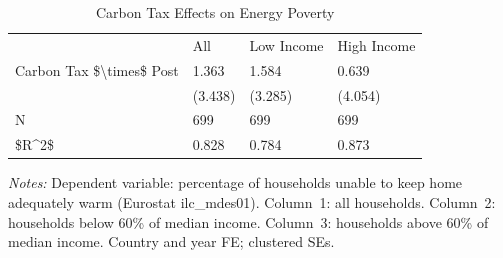 \begin{table}[htbp]
\centering
\caption{Carbon Tax Effects on Energy Poverty\label{tab:epov}}
\begin{tabular}{llll}
& All & Low Income & High Income \\
Carbon Tax \$\textbackslash{}times\$ Post & 1.363 & 1.584 & 0.639 \\
& (3.438) & (3.285) & (4.054) \\
N & 699 & 699 & 699 \\
\$R\textasciicircum{}2\$ & 0.828 & 0.784 & 0.873 \\
\end{tabular}
\begin{minipage}{0.95\textwidth}
\vspace{0.3em}
\footnotesize \textit{Notes:} Dependent variable: percentage of households unable to keep home adequately warm (Eurostat ilc\_mdes01). Column~1: all households. Column~2: households below 60\% of median income. Column~3: households above 60\% of median income. Country and year FE; clustered SEs.
\end{minipage}
\end{table}

